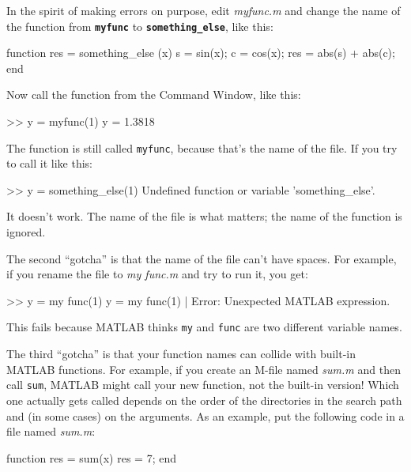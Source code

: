 \documentclass[../../book.tex]{subfiles}
\begin{document}

In the spirit of making errors on purpose, edit \emph{myfunc.m} and change the name of the function from \textbf{\lstinline{myfunc}} to \textbf{\lstinline{something_else}}, like this:

\begin{code}
function res = something_else (x)
    s = sin(x);
    c = cos(x);
    res = abs(s) + abs(c);
end
\end{code}

Now call the function from the Command Window, like this:

\begin{code}
>> y = myfunc(1)
y = 1.3818
\end{code}

The function is still called \lstinline{myfunc}, because that's the name of the file.
If you try to call it like this:

\begin{code}
>> y = something_else(1)
Undefined function or variable 'something_else'.
\end{code}

It doesn't work.  The name of the file is what matters; the name of the function is ignored.

The second ``gotcha'' is that the name of the file can't have spaces.
For example, if you rename the file to \emph{my func.m}
and try to run it, you get:

\begin{code}
>> y = my func(1)
 y = my func(1)
        |
Error: Unexpected MATLAB expression.
\end{code}

This fails because MATLAB thinks \lstinline{my} and \lstinline{func} are two different
variable names.

The third ``gotcha'' is that your function names can collide with built-in
MATLAB functions.  For example, if you create an M-file named \emph{sum.m} and then call \lstinline{sum}, MATLAB might call your new
function, not the built-in version!  Which one actually gets called
depends on the order of the directories in the search path and
(in some cases) on the arguments.  As an example, put the following
code in a file named \emph{sum.m}:


\begin{code}
function res = sum(x)
   res = 7;
end
\end{code}
\end{document}

